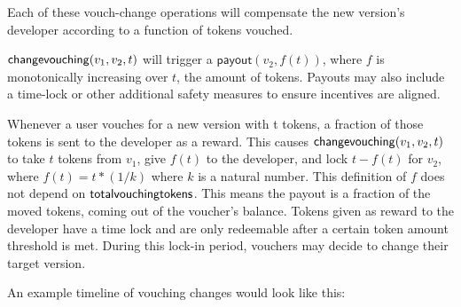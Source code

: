 \documentclass[]{article}
\makeatletter
\let\_\relax
\DeclareRobustCommand{\_}{%
  \leavevmode\vbox{%
    \hrule\@width.5em
          \@height-.26ex
          \@depth\dimexpr.26ex+.28pt\relax}}
\makeatother
\begin{document}
Each of these vouch-change operations will compensate the new version's
developer according to a function of tokens vouched.

$\mathsf{change\_vouching}(v_1, v_2, t)$ will trigger a
$\mathsf{payout}(v_2, f(t))$, where $f$ is monotonically increasing over $t$,
the amount of tokens. Payouts may also include a time-lock or other additional
safety measures to ensure incentives are aligned.

Whenever a user vouches for a new version with t tokens, a fraction of
those tokens is sent to the developer as a reward. This causes
$\mathsf{change\_vouching}(v_1, v_2, t)$ to take $t$ tokens from $v_1$, give $f(t)$
to the developer, and lock $t - f(t)$ for $v_2$, where $f(t) = t * (1/k)$
where $k$ is a natural number. This definition of $f$ does not depend
on $\mathsf{total\_vouching\_tokens}$. This means the payout is a fraction of the
moved tokens, coming out of the voucher's balance.
Tokens given as reward to the developer have a time lock and are only
redeemable after a certain token amount threshold is met. During this lock-in
period, vouchers may decide to change their target version.

  An example timeline of vouching changes would look like this:
\end{document}
